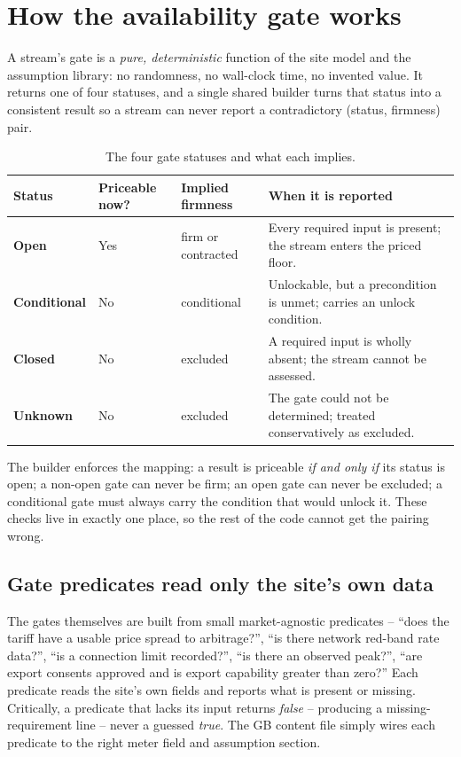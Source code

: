 \section{How the availability gate works}
\label{sec:gates}

A stream's gate is a \emph{pure, deterministic} function of the site model and the assumption library: no randomness, no wall-clock time, no invented value. It returns one of four statuses, and a single shared builder turns that status into a consistent result so a stream can never report a contradictory (status, firmness) pair.

\begin{table}[H]
\centering
\caption{The four gate statuses and what each implies.}
\label{tab:gatestatus}
\small\sffamily
\begin{tabularx}{\textwidth}{@{}l l l L@{}}
\toprule
\textbf{Status} & \textbf{Priceable now?} & \textbf{Implied firmness} & \textbf{When it is reported} \\
\midrule
\textbf{Open} & Yes & firm or contracted & Every required input is present; the stream enters the priced floor. \\
\textbf{Conditional} & No & conditional & Unlockable, but a precondition is unmet; carries an unlock condition. \\
\textbf{Closed} & No & excluded & A required input is wholly absent; the stream cannot be assessed. \\
\textbf{Unknown} & No & excluded & The gate could not be determined; treated conservatively as excluded. \\
\bottomrule
\end{tabularx}
\end{table}

The builder enforces the mapping: a result is priceable \emph{if and only if} its status is open; a non-open gate can never be firm; an open gate can never be excluded; a conditional gate must always carry the condition that would unlock it. These checks live in exactly one place, so the rest of the code cannot get the pairing wrong.

\subsection{Gate predicates read only the site's own data}

The gates themselves are built from small market-agnostic predicates -- ``does the tariff have a usable price spread to arbitrage?'', ``is there network red-band rate data?'', ``is a connection limit recorded?'', ``is there an observed peak?'', ``are export consents approved and is export capability greater than zero?'' Each predicate reads the site's own fields and reports what is present or missing. Critically, a predicate that lacks its input returns \emph{false} -- producing a missing-requirement line -- never a guessed \emph{true}. The GB content file simply wires each predicate to the right meter field and assumption section.

